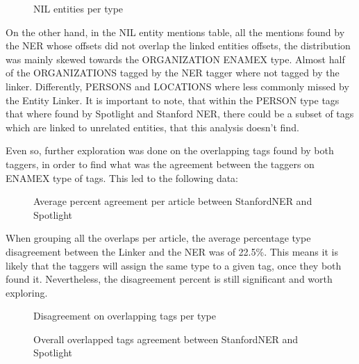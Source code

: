 \begin{figure}[h]
  \label{fig:nilspertype}
  \centering
  \caption{NIL entities per type}
\end{figure}

On the other hand, in the NIL entity mentions table, all the mentions found by the NER whose offsets did not overlap the linked entities offsets,
the distribution was mainly skewed towards the ORGANIZATION ENAMEX type.
Almost half of the ORGANIZATIONS tagged by the NER tagger where not tagged by the linker.
Differently, PERSONS and LOCATIONS where less commonly missed by the Entity Linker.
It is important to note, that within the PERSON type tags that where found by Spotlight and Stanford NER, there could be a subset of tags which are linked to unrelated entities,
that this analysis doesn't find.

Even so, further exploration was done on the overlapping tags found by both taggers,
in order to find what was the agreement between the taggers on ENAMEX type of tags. 
This led to the following data:

\begin{figure}[h]
  \label{fig:avgagreementpercentnernel}
  \centering
  \caption{Average percent agreement per article between StanfordNER and Spotlight}
\end{figure}

When grouping all the overlaps per article, the average percentage type disagreement between the Linker and the NER was of 22.5\%.
This means it is likely that the taggers will assign the same type to a given tag, once they both found it.
Nevertheless, the disagreement percent is still significant and worth exploring.

\begin{figure}[h]
    \label{fig:disagreementpertype}
    \centering
    \caption{Disagreement on overlapping tags per type}
\end{figure}

\begin{figure}[h]
    \label{fig:agreementvsdisagreementpercent}
    \centering
    \caption{Overall overlapped tags agreement between StanfordNER and Spotlight}
\end{figure}

